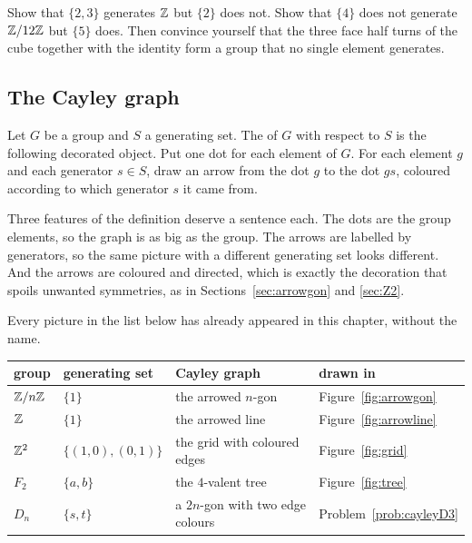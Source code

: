 \begin{tryit}
Show that $\{2,3\}$ generates $\mathbb{Z}$ but $\{2\}$ does not. Show that $\{4\}$ does not generate
$\mathbb{Z}/12\mathbb{Z}$ but $\{5\}$ does. Then convince yourself that the three face half turns of the cube
together with the identity form a group that no single element generates.
\end{tryit}

\subsection{The Cayley graph}

\begin{defi}\label{def:cayley}
Let $G$ be a group and $S$ a generating set. The  of $G$ with respect to $S$ is
the following decorated object. Put one dot for each element of $G$. For each element $g$ and each
generator $s\in S$, draw an arrow from the dot $g$ to the dot $gs$, coloured according to which
generator $s$ it came from.
\end{defi}

Three features of the definition deserve a sentence each. The dots are the group elements, so the
graph is as big as the group. The arrows are labelled by generators, so the same picture with a
different generating set looks different. And the arrows are coloured and directed, which is exactly
the decoration that spoils unwanted symmetries, as in Sections~\ref{sec:arrowgon} and \ref{sec:Z2}.

Every picture in the list below has already appeared in this chapter, without the name.

\begin{center}
\small
\begin{tabular}{@{}llll@{}}
\toprule
group & generating set & Cayley graph & drawn in\\
\midrule
$\mathbb{Z}/n\mathbb{Z}$ & $\{1\}$ & the arrowed $n$-gon & Figure~\ref{fig:arrowgon}\\
$\mathbb{Z}$ & $\{1\}$ & the arrowed line & Figure~\ref{fig:arrowline}\\
$\mathbb{Z}^2$ & $\{(1,0),(0,1)\}$ & the grid with coloured edges & Figure~\ref{fig:grid}\\
$F_2$ & $\{a,b\}$ & the $4$-valent tree & Figure~\ref{fig:tree}\\
$D_n$ & $\{s,t\}$ & a $2n$-gon with two edge colours & Problem~\ref{prob:cayleyD3}\\
\bottomrule
\end{tabular}
\end{center}

